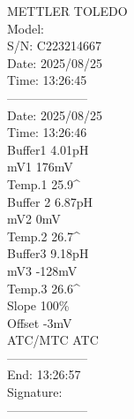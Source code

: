 \documentclass[UTF8,10pt,a4paper,fontset=fandol]{ctexart}
\newcommand{\fieldvalue}[1]{#1}
\begin{document}
\newpage

\begin{flushleft}
\ttfamily
METTLER TOLEDO\\
Model:\\
S/N: %
\fieldvalue{C223214667}\\
Date: %
\fieldvalue{2025/08/25}\\
Time: %
\fieldvalue{13:26:45}\\
\hspace*{1em}--------------------\\
Date: %
\fieldvalue{2025/08/25}\\
Time: %
\fieldvalue{13:26:46}\\
Buffer1 %
\fieldvalue{4.01pH}\\
mV1 %
\fieldvalue{176mV}\\
Temp.1 %
\fieldvalue{25.9^{\circ}}\\
Buffer 2 %
\fieldvalue{6.87pH}\\
mV2 %
\fieldvalue{0mV}\\
Temp.2 %
\fieldvalue{26.7^{\circ}}\\
Buffer3 %
\fieldvalue{9.18pH}\\
mV3 %
\fieldvalue{-128mV}\\
Temp.3 %
\fieldvalue{26.6^{\circ}}\\
Slope %
\fieldvalue{100\%}\\
Offset %
\fieldvalue{-3mV}\\
ATC/MTC %
\fieldvalue{ATC}\\[1em]
--------------------\\
End: %
\fieldvalue{13:26:57}\\
Signature:\\
--------------------\\[1em]


\end{flushleft}
\end{document}
